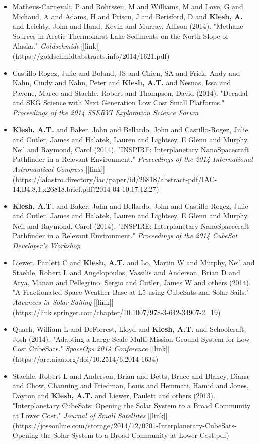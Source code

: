 \documentclass[11pt,letterpaper]{article}
\begin{document}
\begin{itemize}
\item Matheus-Carnevali, P and Rohrssen, M and Williams, M and Love, G and Michaud, A and Adams, H and Priscu, J and Berisford, D and \textbf{Klesh, A.} and Leichty, John and Hand, Kevin and Murray, Allison (2014). "Methane Sources in Arctic Thermokarst Lake Sediments on the North Slope of Alaska." \textit{Goldschmidt} [[link]](https://goldschmidtabstracts.info/2014/1621.pdf)
\item Castillo-Rogez, Julie and Boland, JS and Chien, SA and Frick, Andy and Kahn, Cindy and Kahn, Peter and \textbf{Klesh, A.T.} and Nesnas, Issa and Pavone, Marco and Staehle, Robert and Thompson, David (2014). "Decadal and SKG Science with Next Generation Low Cost Small Platforms." \textit{Proceedings of the 2014 SSERVI Exploration Science Forum}
\item \textbf{Klesh, A.T.} and Baker, John and Bellardo, John and Castillo-Rogez, Julie and Cutler, James and Halatek, Lauren and Lightsey, E Glenn and Murphy, Neil and Raymond, Carol (2014). "INSPIRE: Interplanetary NanoSpacecraft Pathfinder in a Relevant Environment." \textit{Proceedings of the 2014 International Astronautical Congress} [[link]](https://iafastro.directory/iac/paper/id/26818/abstract-pdf/IAC-14,B4,8,1,x26818.brief.pdf?2014-04-10.17:12:27)
\item \textbf{Klesh, A.T.} and Baker, John and Bellardo, John and Castillo-Rogez, Julie and Cutler, James and Halatek, Lauren and Lightsey, E Glenn and Murphy, Neil and Raymond, Carol (2014). "INSPIRE: Interplanetary NanoSpacecraft Pathfinder in a Relevant Environment." \textit{Proceedings of the 2014 CubeSat Developer's Workshop}
\item Liewer, Paulett C and \textbf{Klesh, A.T.} and Lo, Martin W and Murphy, Neil and Staehle, Robert L and Angelopoulos, Vassilis and Anderson, Brian D and Arya, Manan and Pellegrino, Sergio and Cutler, James W and others (2014). "A Fractionated Space Weather Base at L5 using CubeSats and Solar Sails." \textit{Advances in Solar Sailing} [[link]](https://link.springer.com/chapter/10.1007/978-3-642-34907-2\_19)
\item Quach, William L and DeForrest, Lloyd and \textbf{Klesh, A.T.} and Schoolcraft, Josh (2014). "Adapting a Large-Scale Multi-Mission Ground System for Low-Cost CubeSats." \textit{SpaceOps 2014 Conference} [[link]](https://arc.aiaa.org/doi/10.2514/6.2014-1634)
\item Staehle, Robert L and Anderson, Brian and Betts, Bruce and Blaney, Diana and Chow, Channing and Friedman, Louis and Hemmati, Hamid and Jones, Dayton and \textbf{Klesh, A.T.} and Liewer, Paulett and others (2013). "Interplanetary CubeSats: Opening the Solar System to a Broad Community at Lower Cost." \textit{Journal of Small Satellites} [[link]](https://jossonline.com/storage/2014/12/0201-Interplanetary-CubeSats-Opening-the-Solar-System-to-a-Broad-Community-at-Lower-Cost.pdf)

\end{itemize}
\end{document}
